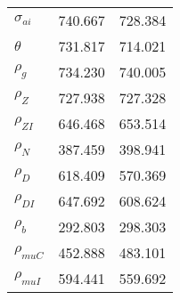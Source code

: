 \begin{center}
\begin{longtable}{lcc}
$ {\sigma_{ai}}        $	 & 	     740.667	 & 	     728.384 \\ 
$ {\theta}             $	 & 	     731.817	 & 	     714.021 \\ 
$ {\rho_g}             $	 & 	     734.230	 & 	     740.005 \\ 
$ {\rho_Z}             $	 & 	     727.938	 & 	     727.328 \\ 
$ {\rho_{ZI}}          $	 & 	     646.468	 & 	     653.514 \\ 
$ {\rho_N}             $	 & 	     387.459	 & 	     398.941 \\ 
$ {\rho_D}             $	 & 	     618.409	 & 	     570.369 \\ 
$ {\rho_{DI}}          $	 & 	     647.692	 & 	     608.624 \\ 
$ {\rho_b}             $	 & 	     292.803	 & 	     298.303 \\ 
$ {\rho_{muC}}         $	 & 	     452.888	 & 	     483.101 \\ 
$ {\rho_{muI}}         $	 & 	     594.441	 & 	     559.692 \\ 
\end{longtable}
 \end{center}
